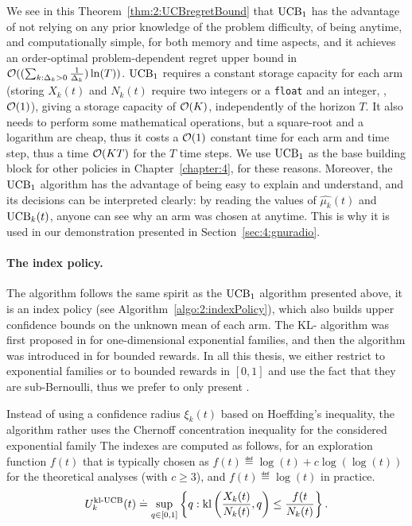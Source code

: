We see in this Theorem~\ref{thm:2:UCBregretBound} that $\mathrm{UCB}_1$ has the advantage of not relying on any prior knowledge of the problem difficulty, of being anytime, and computationally simple, for both memory and time aspects, and it achieves an order-optimal problem-dependent regret upper bound in $\mathcal{O}((\sum_{k: \Delta_k>0} \frac{1}{\Delta_k})\ln(T))$.
%
$\mathrm{UCB}_1$ requires a constant storage capacity for each arm (storing $X_k(t)$ and $N_k(t)$ require two integers or a \texttt{float} and an integer, \ie, $\mathop{}\mathopen{}\mathcal{O}\mathopen{}\left(1\right)$), giving a storage capacity of $\mathop{}\mathopen{}\mathcal{O}\mathopen{}\left(K\right)$, independently of the horizon $T$.
It also needs to perform some mathematical operations, but a square-root and a logarithm are cheap, thus it costs a $\mathop{}\mathopen{}\mathcal{O}\mathopen{}\left(1\right)$ constant time for each arm and time step, thus a time $\mathop{}\mathopen{}\mathcal{O}\mathopen{}\left(K T\right)$ for the $T$ time steps.
%
We use $\mathrm{UCB}_1$ as the base building block for other policies in Chapter~\ref{chapter:4}, for these reasons.
Moreover, the $\mathrm{UCB}_1$ algorithm has the advantage of being easy to explain and understand, and its decisions can be interpreted clearly: by reading the values of $\widehat{\mu_k}(t)$ and $\mathrm{UCB}_k(t)$, anyone can see why an arm was chosen at anytime.
This is why it is used in our demonstration presented in Section~\ref{sec:4:gnuradio}.


\paragraph{The \klUCB{} index policy.}
%
The \klUCB{} algorithm follows the same spirit as the $\mathrm{UCB}_1$ algorithm presented above,
it is an index policy (see Algorithm~\ref{algo:2:indexPolicy}),
which also builds upper confidence bounds on the unknown mean of each arm.
The KL-\UCB{} algorithm was first proposed in \cite{Garivier11KL} for one-dimensional exponential families,
and then the \klUCB{} algorithm was introduced in \cite{KLUCBJournal} for bounded rewards.
In all this thesis, we either restrict to exponential families or to bounded rewards in $[0,1]$ and use the fact that they are sub-Bernoulli, thus we prefer to only present \klUCB.

Instead of using a confidence radius $\xi_k(t)$ based on Hoeffding's inequality,
the \klUCB{} algorithm rather uses the Chernoff concentration inequality for the considered exponential family
The indexes are computed as follows, for an exploration function $f(t)$
that is typically chosen as $f(t) \eqdef \log(t)+c\log(\log(t))$ for the theoretical analyses (with $c \geq 3$),
and $f(t) \eqdef \log(t)$ in practice.
\begin{align}\label{eq:2:klUCB_index}
    U_k^{\mathrm{kl}\text{-}\mathrm{UCB}}(t) \overset{.}{=} \sup\limits_{q \in [0, 1]} \left\{ q : \mathrm{kl}\left(\frac{X_k(t)}{N_k(t)}, q\right) \leq \frac{f(t}{N_k(t)} \right\}.
\end{align}

